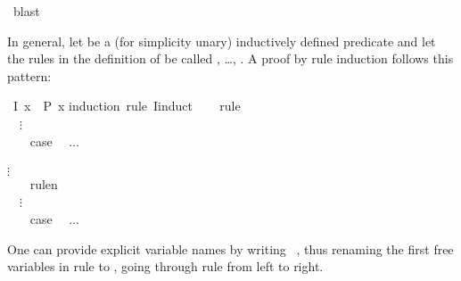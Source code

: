 \begin{isabellebody}
\ blast\isanewline
{}\isamarkupfalse%
%
\endisatagproof
{\isafoldproof}%
%
\isadelimproof
%
\endisadelimproof
%
\begin{isamarkuptext}%
\indent
In general, let  be a (for simplicity unary) inductively defined
predicate and let the rules in the definition of 
be called , \dots, . A proof by rule
induction follows this pattern:%
\end{isamarkuptext}%
\isamarkuptrue%
%
\isadelimproof
%
\endisadelimproof
%
\isatagproof
{}\isamarkupfalse%
\ {}I\ x\ {}\ P\ x{}\isanewline
{}\isamarkupfalse%
{}induction\ rule{}\ I{}induct{}\isanewline
\ \ \isamarkupfalse%
\ rule%
\\[-.4ex]\mbox{}\ \ $\vdots$\\[-.4ex]\mbox{}\hspace{-1ex}
\ \ \isamarkupfalse%
\ {}case\ %
\ $\dots$\\
\isamarkupfalse%
%
\\[-.4ex]$\vdots$\\[-.4ex]\mbox{}\hspace{-1ex}
\isamarkupfalse%
\isanewline
\ \ \isamarkupfalse%
\ rule\isactrlisub n%
\\[-.4ex]\mbox{}\ \ $\vdots$\\[-.4ex]\mbox{}\hspace{-1ex}
\ \ \isamarkupfalse%
\ {}case\ %
\ $\dots$\\
\isamarkupfalse%
%
\endisatagproof
{\isafoldproof}%
%
\isadelimproof
%
\endisadelimproof
%
\begin{isamarkuptext}%
One can provide explicit variable names by writing
~, thus renaming the first 
free variables in rule  to ,
going through rule  from left to right.


\end{isamarkuptext}
\end{isabellebody}
